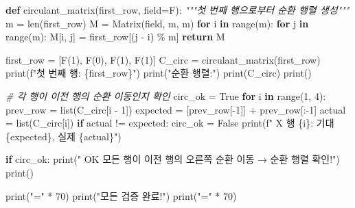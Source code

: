 \documentclass[
  oneside]{article}
\newenvironment{Shaded}{}{}
\newcommand{\BuiltInTok}[1]{\textcolor[rgb]{0.00,0.50,0.00}{#1}}
\newcommand{\CommentTok}[1]{\textcolor[rgb]{0.38,0.63,0.69}{\textit{#1}}}
\newcommand{\ControlFlowTok}[1]{\textcolor[rgb]{0.00,0.44,0.13}{\textbf{#1}}}
\newcommand{\DecValTok}[1]{\textcolor[rgb]{0.25,0.63,0.44}{#1}}
\newcommand{\KeywordTok}[1]{\textcolor[rgb]{0.00,0.44,0.13}{\textbf{#1}}}
\newcommand{\NormalTok}[1]{#1}
\newcommand{\OperatorTok}[1]{\textcolor[rgb]{0.40,0.40,0.40}{#1}}
\newcommand{\SpecialCharTok}[1]{\textcolor[rgb]{0.25,0.44,0.63}{#1}}
\newcommand{\SpecialStringTok}[1]{\textcolor[rgb]{0.73,0.40,0.53}{#1}}
\newcommand{\StringTok}[1]{\textcolor[rgb]{0.25,0.44,0.63}{#1}}
\newcommand{\VariableTok}[1]{\textcolor[rgb]{0.10,0.09,0.49}{#1}}
\begin{document}
\begin{Shaded}
\begin{Highlighting}[]
\KeywordTok{def}\NormalTok{ circulant\_matrix(first\_row, field}\OperatorTok{=}\NormalTok{F):}
    \CommentTok{"""첫 번째 행으로부터 순환 행렬 생성"""}
\NormalTok{    m }\OperatorTok{=} \BuiltInTok{len}\NormalTok{(first\_row)}
\NormalTok{    M }\OperatorTok{=}\NormalTok{ Matrix(field, m, m)}
    \ControlFlowTok{for}\NormalTok{ i }\KeywordTok{in} \BuiltInTok{range}\NormalTok{(m):}
        \ControlFlowTok{for}\NormalTok{ j }\KeywordTok{in} \BuiltInTok{range}\NormalTok{(m):}
\NormalTok{            M[i, j] }\OperatorTok{=}\NormalTok{ first\_row[(j }\OperatorTok{{-}}\NormalTok{ i) }\OperatorTok{\%}\NormalTok{ m]}
    \ControlFlowTok{return}\NormalTok{ M}

\NormalTok{first\_row }\OperatorTok{=}\NormalTok{ [F(}\DecValTok{1}\NormalTok{), F(}\DecValTok{0}\NormalTok{), F(}\DecValTok{1}\NormalTok{), F(}\DecValTok{1}\NormalTok{)]}
\NormalTok{C\_circ }\OperatorTok{=}\NormalTok{ circulant\_matrix(first\_row)}
\BuiltInTok{print}\NormalTok{(}\SpecialStringTok{f"첫 번째 행: }\SpecialCharTok{\{}\NormalTok{first\_row}\SpecialCharTok{\}}\SpecialStringTok{"}\NormalTok{)}
\BuiltInTok{print}\NormalTok{(}\StringTok{"순환 행렬:"}\NormalTok{)}
\BuiltInTok{print}\NormalTok{(C\_circ)}
\BuiltInTok{print}\NormalTok{()}

\CommentTok{\# 각 행이 이전 행의 순환 이동인지 확인}
\NormalTok{circ\_ok }\OperatorTok{=} \VariableTok{True}
\ControlFlowTok{for}\NormalTok{ i }\KeywordTok{in} \BuiltInTok{range}\NormalTok{(}\DecValTok{1}\NormalTok{, }\DecValTok{4}\NormalTok{):}
\NormalTok{    prev\_row }\OperatorTok{=} \BuiltInTok{list}\NormalTok{(C\_circ[i }\OperatorTok{{-}} \DecValTok{1}\NormalTok{])}
\NormalTok{    expected }\OperatorTok{=}\NormalTok{ [prev\_row[}\OperatorTok{{-}}\DecValTok{1}\NormalTok{]] }\OperatorTok{+}\NormalTok{ prev\_row[:}\OperatorTok{{-}}\DecValTok{1}\NormalTok{]}
\NormalTok{    actual }\OperatorTok{=} \BuiltInTok{list}\NormalTok{(C\_circ[i])}
    \ControlFlowTok{if}\NormalTok{ actual }\OperatorTok{!=}\NormalTok{ expected:}
\NormalTok{        circ\_ok }\OperatorTok{=} \VariableTok{False}
        \BuiltInTok{print}\NormalTok{(}\SpecialStringTok{f"  X 행 }\SpecialCharTok{\{}\NormalTok{i}\SpecialCharTok{\}}\SpecialStringTok{: 기대 }\SpecialCharTok{\{}\NormalTok{expected}\SpecialCharTok{\}}\SpecialStringTok{, 실제 }\SpecialCharTok{\{}\NormalTok{actual}\SpecialCharTok{\}}\SpecialStringTok{"}\NormalTok{)}

\ControlFlowTok{if}\NormalTok{ circ\_ok:}
    \BuiltInTok{print}\NormalTok{(}\StringTok{"  OK 모든 행이 이전 행의 오른쪽 순환 이동 → 순환 행렬 확인!"}\NormalTok{)}
\BuiltInTok{print}\NormalTok{()}

\BuiltInTok{print}\NormalTok{(}\StringTok{"="} \OperatorTok{*} \DecValTok{70}\NormalTok{)}
\BuiltInTok{print}\NormalTok{(}\StringTok{"모든 검증 완료!"}\NormalTok{)}
\BuiltInTok{print}\NormalTok{(}\StringTok{"="} \OperatorTok{*} \DecValTok{70}\NormalTok{)}
\end{Highlighting}
\end{Shaded}
\end{document}
